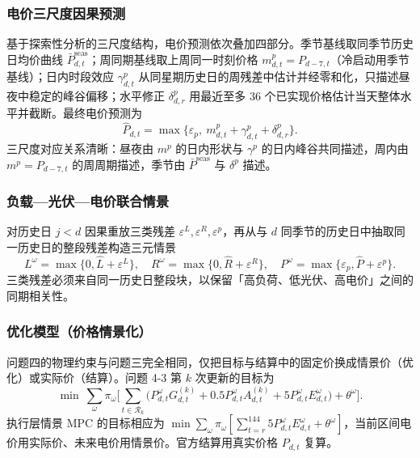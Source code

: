 \subsubsection{电价三尺度因果预测}

基于探索性分析的三尺度结构，电价预测依次叠加四部分。季节基线取同季节历史日均价曲线 $\bar P^{\mathrm{seas}}_{d,t}$；周同期基线取上周同一时刻价格 $m^p_{d,t}=P_{d-7,t}$（冷启动用季节基线）；日内时段效应 $\gamma^p_{d,t}$ 从同星期历史日的周残差中估计并经零和化，只描述昼夜中稳定的峰谷偏移；水平修正 $\delta^p_{d,r}$ 用最近至多 36 个已实现价格估计当天整体水平并截断。最终电价预测为
\begin{equation}
\widehat P_{d,t}=\max\Big\{\varepsilon_p,\ m^p_{d,t}+\gamma^p_{d,t}+\delta^p_{d,r}\Big\}.\label{eq:price4}
\end{equation}
三尺度对应关系清晰：昼夜由 $m^p$ 的日内形状与 $\gamma^p$ 的日内峰谷共同描述，周内由 $m^p=P_{d-7,t}$ 的周周期描述，季节由 $\bar P^{\mathrm{seas}}$ 与 $\delta^p$ 描述。

\subsubsection{负载—光伏—电价联合情景}

对历史日 $j<d$ 因果重放三类残差 $\varepsilon^L,\varepsilon^R,\varepsilon^p$，再从与 $d$ 同季节的历史日中抽取同一历史日的整段残差构造三元情景
\begin{equation}
L^\omega=\max\{0,\widehat L+\varepsilon^L\},\quad R^\omega=\max\{0,\widehat R+\varepsilon^R\},\quad P^\omega=\max\{\varepsilon_p,\widehat P+\varepsilon^p\}.\label{eq:scenario4}
\end{equation}
三类残差必须来自同一历史日整段块，以保留「高负荷、低光伏、高电价」之间的同期相关性。

\subsubsection{优化模型（价格情景化）}

问题四的物理约束与问题三完全相同，仅把目标与结算中的固定价换成情景价（优化）或实际价（结算）。问题 4-3 第 $k$ 次更新的目标为
\begin{equation}
\min\ \sum_{\omega}\pi_\omega\Big[\sum_{t\in\mathcal R_k}\big(P^\omega_{d,t}G^{(k)}_{d,t}+0.5P^\omega_{d,t}A^{(k)}_{d,t}+5P^\omega_{d,t}E^\omega_{d,t}\big)+\theta^\omega\Big].\label{eq:obj4}
\end{equation}
执行层情景 MPC 的目标相应为 $\min\sum_\omega\pi_\omega[\sum_{t=r}^{144}5P^\omega_{d,t}E^\omega_{d,t}+\theta^\omega]$，当前区间电价用实际价、未来电价用情景价。官方结算用真实价格 $P_{d,t}$ 复算。

